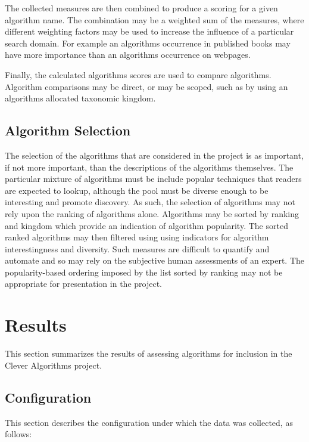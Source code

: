 \documentclass[a4paper, 11pt]{article}
\begin{document}
The collected measures are then combined to produce a scoring for a given algorithm name. The combination may be a weighted sum of the measures, where different weighting factors may be used to increase the influence of a particular search domain. For example an algorithms occurrence in published books may have more importance than an algorithms occurrence on webpages. 

Finally, the calculated algorithms scores are used to compare algorithms. Algorithm comparisons may be direct, or may be scoped, such as by using an algorithms allocated taxonomic kingdom.

% 
% 
\subsection{Algorithm Selection}
The selection of the algorithms that are considered in the project is as important, if not more important, than the descriptions of the algorithms themselves. The particular mixture of algorithms must be include popular techniques that readers are expected to lookup, although the pool must be diverse enough to be interesting and promote discovery. As such, the selection of algorithms may not rely upon the ranking of algorithms alone. Algorithms may be sorted by ranking and kingdom which provide an indication of algorithm popularity. The sorted ranked algorithms may then filtered using using indicators for algorithm interestingness and diversity. Such measures are difficult to quantify and automate and so may rely on the subjective human assessments of an expert. The popularity-based ordering imposed by the list sorted by ranking may not be appropriate for presentation in the project. 

% 
% 
\section{Results}
\label{sec:results}
This section summarizes the results of assessing algorithms for inclusion in the Clever Algorithms project.

% 
% 
\subsection{Configuration}
This section describes the configuration under which the data was collected, as follows: 
\end{document}
